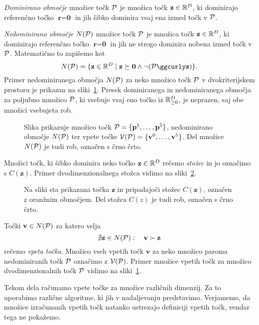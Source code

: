 \begin{definicija}
\textit{Dominirano območje} množice točk $\P$ je množica točk $\textbf{z} \in \R^D$, ki dominirajo referenčno točko $\textbf{r} = \textbf{0}$ in jih šibko dominira vsaj ena izmed točk v $\P$.
\end{definicija}

\begin{definicija}
\textit{Nedominirano območje} $N(\P)$ množice točk $\P$ je množica točk $\textbf{z} \in \R^D$, ki dominirajo referenčno točko $\textbf{r} = \textbf{0}$ in jih ne strogo dominira nobena izmed točk v $\P$. Matematično to zapišemo kot
\[
N(\P) = \{\textbf{z} \in \R^D \mid \textbf{z} \succeq \textbf{0} \land \lnot (\P \ggcurly \textbf{z}) \}. 
\]
Primer nedominiranega območja $N(\P)$ za neko množico točk $\P$ v dvokriterijskem prostoru je prikazan na sliki~\ref{fig:nondominated_area}. Presek dominiranega in nedominiranega območja za poljubno množico $\P$, ki vsebuje vsaj eno točko iz $\R^D_{\geq 0}$, je neprazen, saj obe množici vsebujeta rob.
\end{definicija}
\begin{figure}[htb]
  \centering
  
  \caption{Slika prikazuje množico točk $\P = \{\textbf{p}^1, \dots, \textbf{p}^5\}$, nedominirano območje $N(\P)$ ter vpete točke $\V(\P) = \{\textbf{v}^0, \dots, \textbf{v}^5\}$. Del množice $N(\P)$ je tudi rob, označen s črno črto.}
  \label{fig:nondominated_area}
\end{figure}

\begin{definicija}
Množici točk, ki šibko dominira neko točko $\textbf{z} \in \R^D$ rečemo \textit{stožec} in jo označimo s $C(\textbf{z})$. Primer dvodimenzionalnega stožca vidimo na sliki~\ref{fig:cone}.
\end{definicija}
\begin{figure}[htb]
  \centering
  
  \caption{Na sliki sta prikazana točka $\textbf{z}$ in pripadajoči stožec $C(\textbf{z})$, označen z oranžnim območjem. Del stožca $C(z)$ je tudi rob, označen s črno črto.}
  \label{fig:cone}
\end{figure}



\begin{definicija}
Točki $\textbf{v} \in N(\P)$ za katero velja
\[
\nexists \textbf{z} \in N(\P): \quad \textbf{v} \succ \textbf{z}
\]
rečemo \textit{vpeta točka}. Množico vseh vpetih točk $\textbf{v}$ za neko množico paroma nedominiranih točk $\P$ označimo z $\V(\P)$. Primer množice vpetih točk za množico dvodimenzionalnih točk $\P$ vidimo na sliki~\ref{fig:nondominated_area}.

Tekom dela računamo vpete točke za množice različnih dimenzij. Za to uporabimo različne algoritme, ki jih v nadaljevanju predstavimo. Verjamemo, da množice izračunanih vpetih točk natanko ustrezajo definiciji vpetih točk, vendar tega ne pokažemo. 
\end{definicija}

